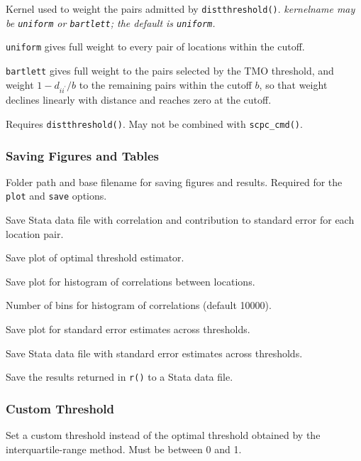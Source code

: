 \documentclass[varwidth,bib]{statapress}
\begin{document}
 Kernel used to weight the pairs admitted by {\tt distthreshold()}.  \it kernelname \rm may be {\tt uniform} or {\tt bartlett}; the default is {\tt uniform}.

\smallskip
\noindent\hspace*{1.5em}\begin{minipage}{\dimexpr\linewidth-1.5em\relax}
{\tt uniform} gives full weight to every pair of locations within the cutoff.
\smallskip

{\tt bartlett} gives full weight to the pairs selected by the TMO threshold, and weight $1-d_{ii^\prime}/b$ to the remaining pairs within the cutoff $b$, so that weight declines linearly with distance and reaches zero at the cutoff.
\end{minipage}
\smallskip

\noindent Requires {\tt distthreshold()}.  May not be combined with {\tt scpc\_cmd()}.

\subsubsection*{Saving Figures and Tables}
 Folder path and base filename for saving figures and results.  Required for the {\tt plot} and {\tt save} options.

 Save Stata data file with correlation and contribution to standard error for each location pair.

 Save plot of optimal threshold estimator.

 Save plot for histogram of correlations between locations.

 Number of bins for histogram of correlations (default 10000).

 Save plot for standard error estimates across thresholds.

 Save Stata data file with standard error estimates across thresholds.

 Save the results returned in {\tt r()} to a Stata data file.

\subsubsection*{Custom Threshold}
 Set a custom threshold instead of the optimal threshold obtained by the interquartile-range method.  Must be between 0 and 1.
\end{document}

